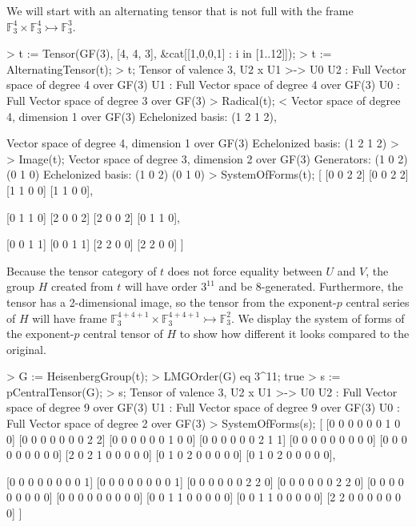 \begin{example}[PGroupsHalfFull]

We will start with an alternating tensor that is not full with the frame
$\mathbb{F}_3^4\times\mathbb{F}_3^4\rightarrowtail \mathbb{F}_3^3$.
\begin{code}
> t := Tensor(GF(3), [4, 4, 3], &cat[[1,0,0,1] : i in [1..12]]);
> t := AlternatingTensor(t);
> t;
Tensor of valence 3, U2 x U1 >-> U0
U2 : Full Vector space of degree 4 over GF(3)
U1 : Full Vector space of degree 4 over GF(3)
U0 : Full Vector space of degree 3 over GF(3)
> Radical(t);
<
    Vector space of degree 4, dimension 1 over GF(3)
    Echelonized basis:
    (1 2 1 2),

    Vector space of degree 4, dimension 1 over GF(3)
    Echelonized basis:
    (1 2 1 2)
>
> Image(t);
Vector space of degree 3, dimension 2 over GF(3)
Generators:
(1 0 2)
(0 1 0)
Echelonized basis:
(1 0 2)
(0 1 0)
> SystemOfForms(t);
[
    [0 0 2 2]
    [0 0 2 2]
    [1 1 0 0]
    [1 1 0 0],

    [0 1 1 0]
    [2 0 0 2]
    [2 0 0 2]
    [0 1 1 0],

    [0 0 1 1]
    [0 0 1 1]
    [2 2 0 0]
    [2 2 0 0]
]
\end{code}

Because the tensor category of $t$ does not force equality between $U$ and $V$,
the group $H$ created from $t$ will have order $3^{11}$ and be 8-generated.
Furthermore, the tensor has a 2-dimensional image, so the tensor from the
exponent-$p$ central series of $H$ will have frame $\mathbb{F}_3^{4+4+1}\times
\mathbb{F}_3^{4+4+1}\rightarrowtail\mathbb{F}_3^2$. We display the system of
forms of the exponent-$p$ central tensor of $H$ to show how different it looks
compared to the original. 
\begin{code}
> G := HeisenbergGroup(t);
> LMGOrder(G) eq 3^11;
true
> s := pCentralTensor(G);
> s;
Tensor of valence 3, U2 x U1 >-> U0
U2 : Full Vector space of degree 9 over GF(3)
U1 : Full Vector space of degree 9 over GF(3)
U0 : Full Vector space of degree 2 over GF(3)
> SystemOfForms(s);
[
    [0 0 0 0 0 0 1 0 0]
    [0 0 0 0 0 0 0 2 2]
    [0 0 0 0 0 0 1 0 0]
    [0 0 0 0 0 0 2 1 1]
    [0 0 0 0 0 0 0 0 0]
    [0 0 0 0 0 0 0 0 0]
    [2 0 2 1 0 0 0 0 0]
    [0 1 0 2 0 0 0 0 0]
    [0 1 0 2 0 0 0 0 0],

    [0 0 0 0 0 0 0 0 1]
    [0 0 0 0 0 0 0 0 1]
    [0 0 0 0 0 0 2 2 0]
    [0 0 0 0 0 0 2 2 0]
    [0 0 0 0 0 0 0 0 0]
    [0 0 0 0 0 0 0 0 0]
    [0 0 1 1 0 0 0 0 0]
    [0 0 1 1 0 0 0 0 0]
    [2 2 0 0 0 0 0 0 0]
]
\end{code}
\end{example}
